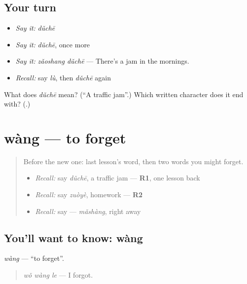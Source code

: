 \subsection*{Your turn}
\begin{itemize}
\raggedright
  \item \emph{Say it:} \emph{dǔchē}
  \item \emph{Say it:} \emph{dǔchē}, once more
  \item \emph{Say it:} \emph{zǎoshang dǔchē} — There's a jam in the mornings.
  \item \emph{Recall:} say \emph{lù}, then \emph{dǔchē} again
\end{itemize}

\begin{tcolorbox}[breakable,colback=teal!4,colframe=teal!35!black,title={Before you move on}]
What does \emph{dǔchē} mean? (\textquotedblleft{}A traffic jam\textquotedblright{}.) Which written character does it end with? (\textbf{}.)
\end{tcolorbox}
\section[wàng]{wàng — to forget}

\label{lesson:ZH-C95-wang}



\begin{quote}
Before the new one: last lesson's word, then two words you might forget.

\begin{itemize}
\raggedright
  \item \emph{Recall:} say \emph{dǔchē}, a traffic jam — \textbf{R1}, one lesson back
  \item \emph{Recall:} say \emph{zuòyè}, homework — \textbf{R2}
  \item \emph{Recall:} say  — \emph{mǎshàng}, right away
\end{itemize}
\end{quote}

\subsection*{You'll want to know: wàng}
\emph{wàng} — \textquotedblleft{}to forget\textquotedblright{}.

\begin{quote}
\emph{wǒ wàng le} — I forgot.
\end{quote}

